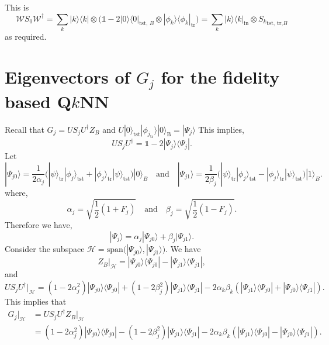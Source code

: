 \documentclass[a4paper,twocolumn,11pt,unpublished]{quantumarticle}
\newcommand{\rang}{\rangle}
\newcommand{\lang}{\langle}
\begin{document}
    This is
    \begin{equation}
        \mathcal W S_0 \mathcal W  ^\dag =\sum_k |k\rang\lang k| \otimes\Big(
        \mathds{1} - 2|0\rang \lang0|_{\text{tst, }B} \otimes |\phi_k \rang \lang \phi_k|_\text{tr}\Big) 
         = \sum_k|k\rang\lang k|_\text{in} \otimes {S_k}_{\text{tst, tr,}B}  
    \end{equation}
    as required. 

\section{Eigenvectors of $G_j$ for the fidelity based  Q$k$NN} \label{app:G_Eig}
    Recall that $G_j = US_j U^\dag Z_B$ and $U |0 \rang_{\text{tst}} | \phi_{j_{\text{tr}}} \rang |0 \rang_{\text{B}} = |\Psi_j \rang$ 
    This implies,
    \begin{equation}
        U S_j U ^ {\dag} = \mathds{1} - 2 |\Psi_{j}\rang \lang \Psi_{j}|.
    \end{equation}    
   Let 
    \begin{equation}
        |\Psi_{j0}\rang = \frac{1}{2 \alpha_j}  \Big(|\psi\rang_{\text{tr}}|\phi_j\rang_\text{tst} + |\phi_j\rang_{\text{tr}}|\psi\rang_\text{tst}\Big)|0\rang_B \quad \text{and} \quad  
        |\Psi_{j1}\rang = \frac{1}{2 \beta_j}  \Big(|\psi\rang_{\text{tr}}|\phi_j\rang_\text{tst} - |\phi_j\rang_{\text{tr}}|\psi\rang_\text{tst}\Big)|1\rang_B.  
    \end{equation}
    where,
    \begin{equation}
        \alpha_j = \sqrt{\frac12(1 + F_j)} \quad \text{and} \quad 
        \beta_j = \sqrt{\frac12(1 - F_j)}. 
    \end{equation}
    Therefore we have,
    \begin{equation}
        |\Psi_{j}\rang = \alpha_j |\Psi_{j0}\rang + \beta_j |\Psi_{j1}\rang.
    \end{equation}
    Consider the subspace $\mathcal{H} = \text{span}\Big(|\Psi_{j0}\rang, |\Psi_{j1}\rang\Big)$. We have
    \begin{equation}
        Z_B \Big|_{\mathcal{H}} = |\Psi_{j0}\rang \lang \Psi_{j0}|
        - |\Psi_{j1}\rang \lang \Psi_{j1}|, 
    \end{equation}
    and
    \begin{equation}
        U S_j U ^ {\dag} \Big|_{\mathcal{H}} = (1 - 2\alpha_j ^ 2) |\Psi_{j0}\rang \lang \Psi_{j0}|
        + (1 - 2\beta_j ^ 2) |\Psi_{j1}\rang \lang \Psi_{j1}|
        - 2\alpha_k \beta_k(|\Psi_{j1}\rang \lang \Psi_{j0}| + |\Psi_{j0}\rang \lang \Psi_{j1}|).
    \end{equation}
    This implies that
    \begin{equation}     \label{g_j_eq}
        \begin{split}
            G_j \Big|_{\mathcal{H}} &= U S_j U ^ {\dag} Z_B \Big|_{\mathcal{H}} \\
            &= (1 - 2\alpha_j ^ 2) |\Psi_{j0}\rang \lang \Psi_{j0}|
            - (1 - 2\beta_j ^ 2) |\Psi_{j1}\rang \lang \Psi_{j1}|
            - 2\alpha_k \beta_k(|\Psi_{j1}\rang \lang \Psi_{j0}| - |\Psi_{j0}\rang \lang \Psi_{j1}|).
        \end{split}
    \end{equation}
    
\end{document}
